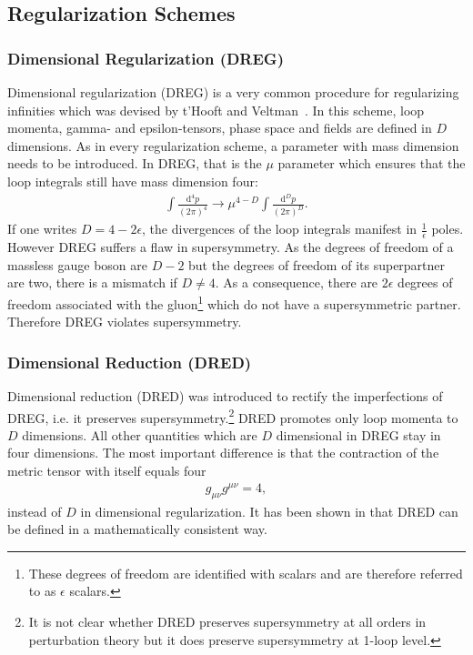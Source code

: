 \subsection{Regularization Schemes}\label{sec:RegSchemes}
\subsubsection*{Dimensional Regularization (DREG)}
Dimensional regularization (DREG) is a very common procedure for regularizing infinities which was devised by t'Hooft and Veltman~\cite{'tHooft:1972fi}. In this scheme, loop momenta, gamma- and epsilon-tensors, phase space and fields are defined in $D$ dimensions\cite{Collins:105730}. As in every regularization scheme, a parameter with mass dimension needs to be introduced. In DREG, that is the $\mu$ parameter which ensures that the loop integrals still have mass dimension four:
\begin{align}
\int \frac{\mbox{d}^4p}{(2\pi)^4} \to \mu^{4-D} \int \frac{\mbox{d}^Dp}{(2\pi)^D}.
\end{align}
If one writes $D=4-2\epsilon$, the divergences of the loop integrals manifest in $\frac{1}{\epsilon}$ poles.\\
However DREG suffers a flaw in supersymmetry. As the degrees of freedom of a massless gauge boson are $D-2$ but the degrees of freedom of its superpartner are two, there is a mismatch if $D \neq 4$. As a consequence, there are $2\epsilon$ degrees of freedom associated with the gluon\footnote{These degrees of freedom are identified with scalars and are therefore referred to as $\epsilon$ scalars.} which do not have a supersymmetric partner. Therefore DREG violates supersymmetry.

\subsubsection*{Dimensional Reduction (DRED)}
Dimensional reduction (DRED) was introduced to rectify the imperfections of DREG, i.e. it preserves supersymmetry.\footnote{It is not clear whether DRED preserves supersymmetry at all orders in perturbation theory\cite{Jack:1997sr} but it does preserve supersymmetry at 1-loop level\cite{Hollik:2001cz}.} DRED promotes only loop momenta to $D$ dimensions. All other quantities which are $D$ dimensional in DREG stay in four dimensions. The most important difference is that the contraction of the metric tensor with itself equals four
\begin{align}
g_{\mu\nu}g^{\mu\nu} = 4,
\end{align}
instead of $D$ in dimensional regularization. It has been shown in \cite{Stockinger:2005gx} that DRED can be defined in a mathematically consistent way.


